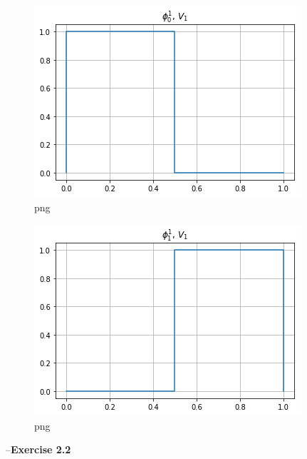 \documentclass{letter}
\newcommand{\paragraph}[1]{\smallskip--\noindent\textbf{#1}}
\begin{document}
\begin{figure}[h]
  \begin{center}
    \includegraphics{output_7_1.png} 
  \end{center}
  \caption{png}
\end{figure}

\begin{figure}[h]
  \begin{center}
    \includegraphics{output_7_2.png} 
  \end{center}
  \caption{png}
\end{figure}

\paragraph{Exercise 2.2}\label{exercise-2.2}
\end{document}
